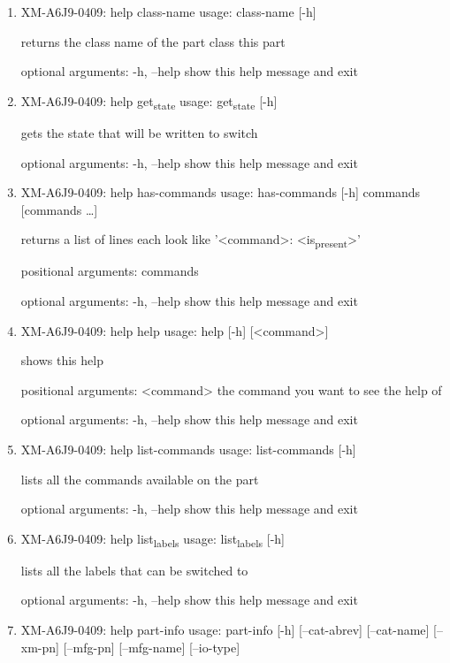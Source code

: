 \documentclass[11pt]{article}
\begin{document}
\begin{enumerate}
\item XM-A6J9-0409: help class-name
\label{sec:org0cbd73a}
usage: class-name [-h]

returns the class name of the part class this part

optional arguments:
  -h, --help  show this help message and exit

\item XM-A6J9-0409: help get\textsubscript{state}
\label{sec:org8e69329}
usage: get\textsubscript{state} [-h]

gets the state that will be written to switch

optional arguments:
  -h, --help  show this help message and exit

\item XM-A6J9-0409: help has-commands
\label{sec:org3a15b1d}
usage: has-commands [-h] commands [commands \ldots{}]

returns a list of lines each look like '<command>: <is\textsubscript{present}>'

positional arguments:
  commands

optional arguments:
  -h, --help  show this help message and exit

\item XM-A6J9-0409: help help
\label{sec:org24e64f0}
usage: help [-h] [<command>]

shows this help

positional arguments:
  <command>   the command you want to see the help of

optional arguments:
  -h, --help  show this help message and exit

\item XM-A6J9-0409: help list-commands
\label{sec:orge5e8677}
usage: list-commands [-h]

lists all the commands available on the part

optional arguments:
  -h, --help  show this help message and exit

\item XM-A6J9-0409: help list\textsubscript{labels}
\label{sec:org7f5624a}
usage: list\textsubscript{labels} [-h]

lists all the labels that can be switched to

optional arguments:
  -h, --help  show this help message and exit

\item XM-A6J9-0409: help part-info
\label{sec:org3deeb63}
usage: part-info  [-h] [--cat-abrev] [--cat-name] [--xm-pn] [--mfg-pn] [--mfg-name]
        [--io-type]


\end{enumerate}
\end{document}
